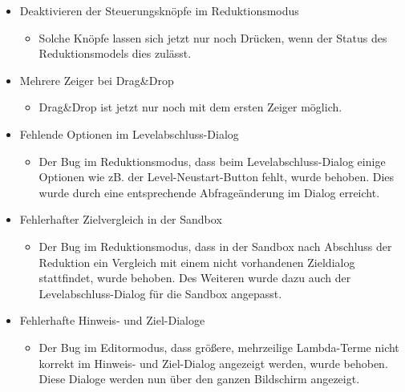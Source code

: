 \begin{itemize}
\item Deaktivieren der Steuerungsknöpfe im Reduktionsmodus
\begin{itemize} 
\item Solche Knöpfe lassen sich jetzt nur noch Drücken, wenn der Status des Reduktionsmodels dies zulässt.
	\end{itemize}
\end{itemize}

\begin{itemize}
\item Mehrere Zeiger bei Drag\&Drop
\begin{itemize} 
\item Drag\&Drop ist jetzt nur noch mit dem ersten Zeiger möglich.
	\end{itemize}
\end{itemize}

\begin{itemize}
\item Fehlende Optionen im Levelabschluss-Dialog
\begin{itemize} 
\item Der Bug im Reduktionsmodus, dass beim Levelabschluss-Dialog einige Optionen wie zB. der Level-Neustart-Button fehlt, wurde behoben. Dies wurde durch eine entsprechende Abfrageänderung im Dialog erreicht.
	\end{itemize}
\end{itemize}

\begin{itemize}
\item Fehlerhafter Zielvergleich in der Sandbox
\begin{itemize} 
\item Der Bug im Reduktionsmodus, dass in der Sandbox nach Abschluss der Reduktion ein Vergleich mit einem nicht vorhandenen Zieldialog stattfindet, wurde behoben. Des Weiteren wurde dazu auch der Levelabschluss-Dialog für die Sandbox angepasst.
	\end{itemize}
\end{itemize}

\begin{itemize}
\item Fehlerhafte Hinweis- und Ziel-Dialoge
\begin{itemize} 
\item Der Bug im Editormodus, dass größere, mehrzeilige Lambda-Terme nicht korrekt im Hinweis- und Ziel-Dialog angezeigt werden, wurde behoben. Diese Dialoge werden nun über den ganzen Bildschirm angezeigt.
	\end{itemize}
\end{itemize}

